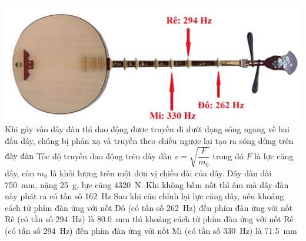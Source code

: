 \begin{ex}
	{\vspace{-0.5cm}\includegraphics[scale=0.5]{../figs/FINAL-SEM1-005-8}}
	{\True Khi gảy vào dây đàn thì dao động được truyền đi dưới dạng sóng ngang về hai đầu dây, chúng bị phản xạ và truyền theo chiều ngược lại tạo ra sóng dừng trên đây đàn}
	{Tốc độ truyền dao động trên dây đàn $v=\sqrt{\dfrac{F}{m_0}}$ trong đó $F$ là lực căng dây, còn $m_0$ là khối lượng trên một đơn vị chiều dài của dây. Dây đàn dài \SI{750}{\milli\meter}, nặng \SI{25}{\gram}, lực căng \SI{4320}{\newton}. Khi không bấm nốt thì âm mà dây đàn này phát ra có tần số \SI{162}{\hertz}}
	{\True Sau khi căn chỉnh lại lực căng dây, nếu khoảng cách từ phím đàn ứng với nốt Đô (có tần số \SI{262}{\hertz}) đến phím đàn ứng với nốt Rê (có tần số \SI{294}{\hertz}) là \SI{80.0}{\milli\meter} thì khoảng cách từ phím đàn ứng với nốt Rê (có tần số \SI{294}{\hertz}) đến phím đàn ứng với nốt Mi (có tần số \SI{330}{\hertz}) là \SI{71.5}{\milli\meter}}
\end{ex}
